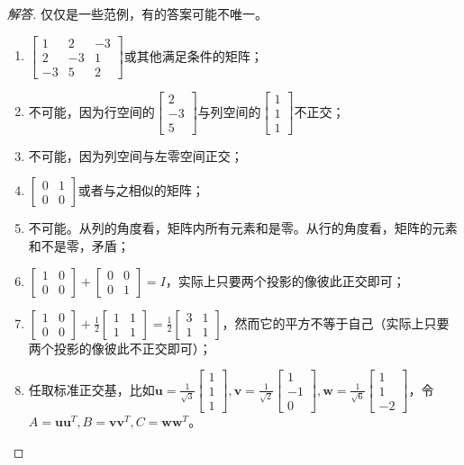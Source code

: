 \documentclass[UTF8]{ctexart}
\begin{document}
\begin{proof}[解答]
仅仅是一些范例，有的答案可能不唯一。
\begin{enumerate}
\item $\begin{bmatrix}1&2&-3\\2&-3&1\\-3&5&2\end{bmatrix}$或其他满足条件的矩阵；
\item 不可能，因为行空间的$\begin{bmatrix}2\\-3\\5\end{bmatrix}$与列空间的$\begin{bmatrix}1\\1\\1\end{bmatrix}$不正交；
\item 不可能，因为列空间与左零空间正交；
\item $\begin{bmatrix}0&1\\0&0\end{bmatrix}$或者与之相似的矩阵；
\item 不可能。从列的角度看，矩阵内所有元素和是零。从行的角度看，矩阵的元素和不是零，矛盾；
\item $\begin{bmatrix}1&0\\0&0\end{bmatrix}+\begin{bmatrix}0&0\\0&1\end{bmatrix}=I$，实际上只要两个投影的像彼此正交即可；
\item $\begin{bmatrix}1&0\\0&0\end{bmatrix}+\frac{1}{2}\begin{bmatrix}1&1\\1&1\end{bmatrix}=\frac{1}{2}\begin{bmatrix}3&1\\1&1\end{bmatrix}$，然而它的平方不等于自己（实际上只要两个投影的像彼此不正交即可）；
\item 任取标准正交基，比如$\bm u=\frac{1}{\sqrt{3}}\begin{bmatrix}1\\1\\1\end{bmatrix},\bm v=\frac{1}{\sqrt{2}}\begin{bmatrix}1\\-1\\0\end{bmatrix},\bm w=\frac{1}{\sqrt{6}}\begin{bmatrix}1\\1\\-2\end{bmatrix}$，令$A=\bm u\bm u^T,B=\bm v\bm v^T,C=\bm w\bm w^T$。
\end{enumerate}
\end{proof}
\end{document}
